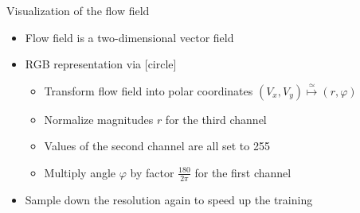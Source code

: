 \begin{frame}{Visualization of the flow field}
\begin{itemize}
\item Flow field is a two-dimensional vector field
\item RGB representation via
[circle]
\begin{itemize}
\item Transform flow field into polar coordinates $(V_x,V_y) \overset{\simeq}{\mapsto} (r, \varphi)$
\item Normalize magnitudes $r$ for the third channel
\item Values of the second channel are all set to 255
\item Multiply angle $\varphi$ by factor $\frac{180}{2\pi}$ for the first channel
\end{itemize}
\item Sample down the resolution again to speed up the training
\end{itemize}


\end{frame}
